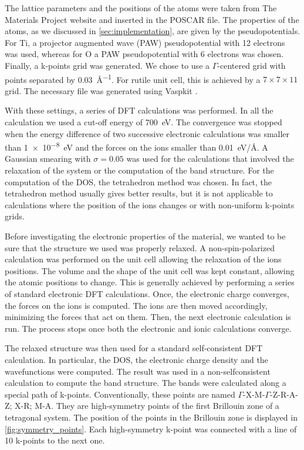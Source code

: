 The lattice parameters and the positions of the atoms were taken from The Materials Project website \cite{Jain2013} and inserted in the  POSCAR file. The properties of the atoms, as we discussed in \cref{sec:implementation}, are given by the pseudopotentials. For Ti, a projector augmented wave (PAW) pseudopotential with 12 electrons was used, whereas for O a PAW pseudopotential with 6 electrons was chosen. Finally, a k-points grid was generated. We chose to use a $\Gamma$-centered grid with points separated by \SI{0.03}{\angstrom^{-1}}. For rutile unit cell, this is achieved by a
$7\times7\times11$ grid. The necessary file was generated using Vaspkit \cite{VASPKIT}.

With these settings, a series of DFT calculations was performed. In all the calculation we used a cut-off energy of \SI{700}{eV}. The convergence was stopped when the energy difference of two successive electronic calculations was smaller than \SI{1e-8}{eV} and the forces on the ions smaller than \SI{0.01}{eV/\angstrom}. A Gaussian smearing with $\sigma = 0.05$ was used for the calculations that involved the relaxation of the system or the computation of the band structure. For the computation of the DOS, the tetrahedron method was chosen. In fact, the tetrahedron method usually gives better results, but it is not applicable to calculations where the position of the ions changes or with non-uniform k-points grids.

Before investigating the electronic properties of the material, we wanted to be sure that the structure we used was properly relaxed. A non-spin-polarized calculation was performed on the unit cell allowing the relaxation of the ions positions. The volume and the shape of the unit cell was kept constant, allowing the atomic positions to change. This is generally achieved by performing a series of standard electronic DFT calculations. Once, the electronic charge converges, the forces on the ions is computed. The ions are then moved accordingly, minimizing the forces that act on them. Then, the next electronic calculation is run. The process stops once both the electronic and ionic calculations converge.

The relaxed structure was then used for a standard self-consistent DFT calculation. In particular, the DOS, the electronic charge density and the wavefunctions were computed. The result was used in a non-selfconsistent calculation to compute the band structure. The bands were calculated along a special path of k-points. Conventionally, these points are named  $\Gamma$-X-M-$\Gamma$-Z-R-A-Z; X-R; M-A. They are high-symmetry points of the first Brillouin zone of a tetragonal system. The position of the points in the Brillouin zone is displayed in \cref{fig:symmetry_points}. Each high-symmetry k-point was connected with a line of 10 k-points to the next one.

